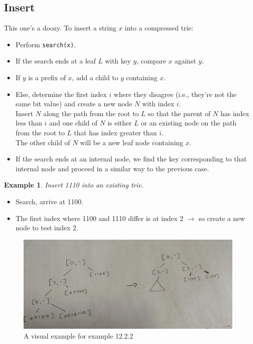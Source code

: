 \documentclass{report}
\newtheorem{ex}{Example}[section]
\begin{document}
\subsection{Insert}
This one's a doozy. To insert a string $x$ into a compressed trie:
\begin{itemize}
\item Perform \texttt{search(x)}.
\item If the search ends at a leaf $L$ with key $y$, compare $x$ against $y$.
\item If $y$ is a prefix of $x$, add a child to $y$ containing $x$.
\item Else, determine the first index $i$ where they disagree (i.e., they're not the same bit value) and create a new node $N$ with index $i$.\\
Insert $N$ along the path from the root to $L$ so that the parent of $N$ has index less than $i$ and one child of $N$ is either $L$ or an existing node on the path from the root to $L$ that has index greater than $i$.\\The other child of $N$ will be a new leaf node containing $x$.
\item If the search ends at an internal node, we find the key corresponding to that internal node and proceed in a similar way to the previous case.
\end{itemize}
\begin{ex}
Insert 1110 into an existing trie.
\end{ex}
\begin{itemize}
\item Search, arrive at 1100.
\item The first index where 1100 and 1110 differ is at index 2 $\rightarrow$ so create a new node to test index 2.
\end{itemize}
\begin{figure}[ht]
\begin{center}
\includegraphics[scale=0.1]{trieEx1.jpg}
\end{center}
\caption{A visual example for example 12.2.2}
\end{figure}
\end{document}

